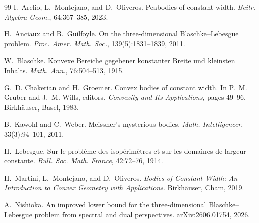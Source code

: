 \documentclass[11pt]{article}
\numberwithin{equation}{section}
\theoremstyle{remark}
\begin{document}
\begin{thebibliography}{99}
I.~Arelio, L.~Montejano, and D.~Oliveros.
\newblock Peabodies of constant width.
\newblock \emph{Beitr. Algebra Geom.}, 64:367--385, 2023.

H.~Anciaux and B.~Guilfoyle.
\newblock On the three-dimensional Blaschke--Lebesgue problem.
\newblock \emph{Proc. Amer. Math. Soc.}, 139(5):1831--1839, 2011.

W.~Blaschke.
\newblock Konvexe Bereiche gegebener konstanter Breite und kleinsten Inhalts.
\newblock \emph{Math. Ann.}, 76:504--513, 1915.

G.~D. Chakerian and H.~Groemer.
\newblock Convex bodies of constant width.
\newblock In P.~M. Gruber and J.~M. Wills, editors, \emph{Convexity and Its Applications}, pages 49--96. Birkh\"auser, Basel, 1983.

B.~Kawohl and C.~Weber.
\newblock Meissner's mysterious bodies.
\newblock \emph{Math. Intelligencer}, 33(3):94--101, 2011.

H.~Lebesgue.
\newblock Sur le probl\`eme des isop\'erim\`etres et sur les domaines de largeur constante.
\newblock \emph{Bull. Soc. Math. France}, 42:72--76, 1914.

H.~Martini, L.~Montejano, and D.~Oliveros.
\newblock \emph{Bodies of Constant Width: An Introduction to Convex Geometry with Applications}.
\newblock Birkh\"auser, Cham, 2019.

A.~Nishioka.
\newblock An improved lower bound for the three-dimensional Blaschke--Lebesgue problem from spectral and dual perspectives.
\newblock arXiv:2606.01754, 2026.
\end{thebibliography}
\end{document}
